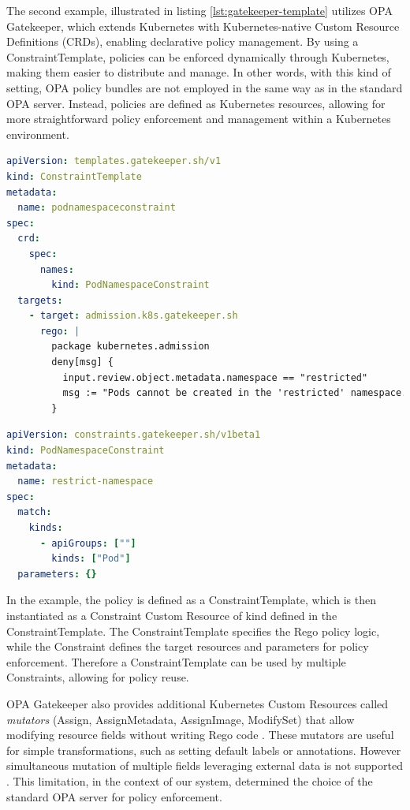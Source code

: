 The second example, illustrated in listing \ref{lst:gatekeeper-template} utilizes OPA Gatekeeper, which extends Kubernetes with Kubernetes-native Custom Resource Definitions (CRDs), enabling declarative policy management. By using a ConstraintTemplate, policies can be enforced dynamically through Kubernetes, making them easier to distribute and manage.
In other words, with this kind of setting, OPA policy bundles are not employed in the same way as in the standard OPA server. Instead, policies are defined as Kubernetes resources, allowing for more straightforward policy enforcement and management within a Kubernetes environment.

\begin{lstlisting}[language=yaml, caption={OPA Gatekeeper ConstraintTemplate}, label={lst:gatekeeper-template}]
apiVersion: templates.gatekeeper.sh/v1
kind: ConstraintTemplate
metadata:
  name: podnamespaceconstraint
spec:
  crd:
    spec:
      names:
        kind: PodNamespaceConstraint
  targets:
    - target: admission.k8s.gatekeeper.sh
      rego: |
        package kubernetes.admission
        deny[msg] {
          input.review.object.metadata.namespace == "restricted"
          msg := "Pods cannot be created in the 'restricted' namespace."
        }
\end{lstlisting}

\begin{lstlisting}[language=yaml, caption={OPA Gatekeeper Constraint}, label={lst:gatekeeper-constraint}, float=htpb]
apiVersion: constraints.gatekeeper.sh/v1beta1
kind: PodNamespaceConstraint
metadata:
  name: restrict-namespace
spec:
  match:
    kinds:
      - apiGroups: [""]
        kinds: ["Pod"]
  parameters: {}
\end{lstlisting}

In the example, the policy is defined as a ConstraintTemplate, which is then instantiated as a Constraint Custom Resource of kind defined in the ConstraintTemplate. 
The ConstraintTemplate specifies the Rego policy logic, while the Constraint defines the target resources and parameters for policy enforcement. Therefore a ConstraintTemplate can be used by multiple Constraints, allowing for policy reuse.

OPA Gatekeeper also provides additional Kubernetes Custom Resources called \textit{mutators} (Assign, AssignMetadata, AssignImage, ModifySet) that allow modifying resource fields without writing Rego code \cite{opa_gatekeeper}. 
These mutators are useful for simple transformations, such as setting default labels or annotations. However simultaneous mutation of multiple fields leveraging external data is not supported \cite{opa_gatekeeper_external_data}. 
This limitation, in the context of our system, determined the choice of the standard OPA server for policy enforcement. \newline

